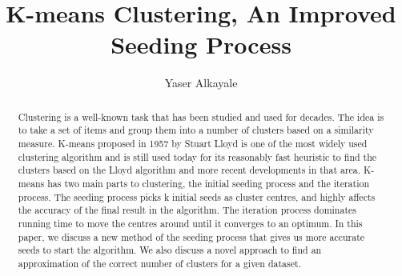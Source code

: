 \documentclass[12pt]{dalthesis}
\DeclarePairedDelimiter\abs{\lvert}{\rvert}%
\DeclarePairedDelimiter\norm{\lVert}{\rVert}%
\begin{document}
\makeatletter
\let\oldabs\abs
\def\abs{\@ifstar{\oldabs}{\oldabs*}}
%
\let\oldnorm\norm
\def\norm{\@ifstar{\oldnorm}{\oldnorm*}}
\makeatother
\newcommand*{\Value}{\frac{1}{2}x^2}%


\title{K-means Clustering, An Improved Seeding Process }
\author{Yaser Alkayale}

\bcshon  %





\nolistoftables

\frontmatter

\begin{abstract}
  \paragraph{}
  Clustering is a well-known task that has been studied and used for decades. The idea is to take a set of items and group them into a number of clusters based on a similarity measure. K-means proposed in 1957 by Stuart Lloyd is one of the most widely used clustering algorithm and is still used today for its reasonably fast heuristic to find the clusters based on the Lloyd algorithm and more recent developments in that area. K-means has two main parts to clustering, the initial seeding process and the iteration process. The seeding process picks k initial seeds as cluster centres, and highly affects the accuracy of the final result in the algorithm. The iteration process dominates running time to move the centres around until it converges to an optimum. In this paper, we discuss a new method of the seeding process that gives us more accurate seeds to start the algorithm. We also discuss a novel approach to find an approximation of the correct number of clusters for a given dataset.
\end{abstract}
\end{document}
